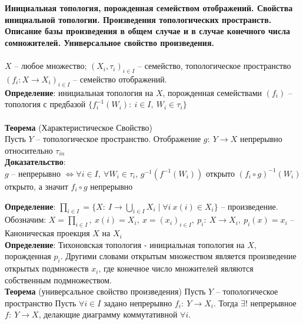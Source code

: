 \newpage
\section{}
	\textbf{Инициальная топология, порожденная семейством отображений. Свойства инициальной топологии. Произведения топологических пространств. Описание базы произведения в общем случае и в случае конечного числа сомножителей. Универсальное свойство произведения.}\\
	\\
	$X$ -- любое множество; $(X_i, \tau_i)_{i \in I}$ -- семейство, топологическое пространство $(f_i: X\rightarrow X_i)_{i \in I}$ -- семейство отображений.\\
	\textbf{Определение}: инициальная топология на $X$, порожденная семействами $(f_i)$ -- топология с предбазой $\{f_i^{-1}(W_i):\ i \in I,\ W_i \in \tau_i\}$\\
	\\
	\textbf{Теорема} (Характеристическое Свойство)\\ 
	Пусть $Y$ -- топологическое пространство. Отображение $g:\ Y\rightarrow X$ непрерывно относительно $\tau_{in}$\\
	\textbf{Доказательство}:\\
	$g$ -- непрерывно $\Leftrightarrow \forall i \in I,\ \forall W_i \in \tau_i$, $g^{-1}(f^{-1}(W_i))$ открыто $(f_i \circ g)^{-1}(W_i)$ открыто, а значит $f_i \circ g$ непрерывно\\
	\begin{figure}[h]
	\end{figure}	
	\textbf{Определение}: $\prod_{i \in I} = \{X:\ I\rightarrow \bigcup_{i\in I}X_i \mid \forall i\ x(i)\in X_i\}$ -- произведение. Обозначим: $X = \prod_{i\in I},\ x(i) = X_i,\ x = (x_{i})_{i \in I},\ p_i:\ X \rightarrow X_i,\ p_i(x) = x_i$ -- Каноническая проекция $X$ на $X_i$\\
	\textbf{Определение}: Тихоновская топология - инициальная топология на $X$, порожденная $p_i$. Другими словами открытым множеством является произведение открытых подмножеств $x_i$, где конечное число множителей являются собственным подмножеством.\\
	\textbf{Теорема} (универсальное свойство произведения)
	Пусть $Y$ -- топологическое пространство Пусть $\forall i \in I$ задано непрерывно $f_i:\ Y\rightarrow X_i$. Тогда $\exists!$ непрерывное $f:\ Y\rightarrow X$, делающие диаграмму коммутативной $\forall i$.\\
